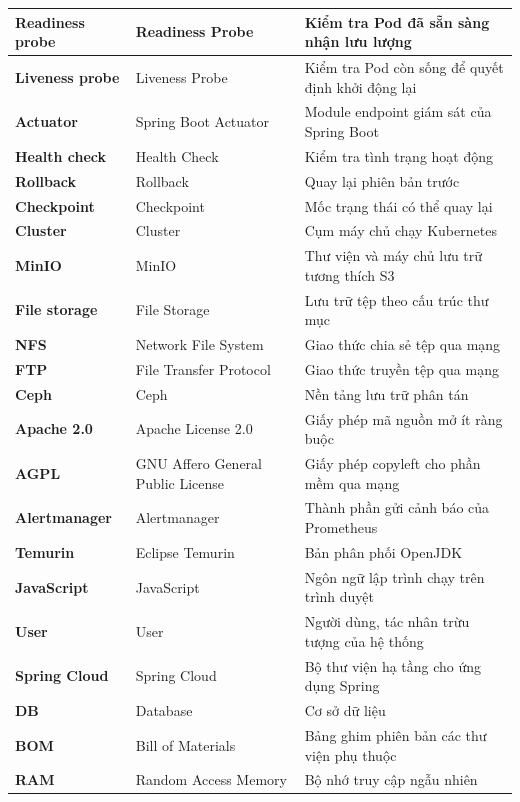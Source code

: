 \documentclass[../BTL.tex]{subfiles}
\begin{document}
\begin{longtable}{|p{3.2cm}|p{3.5cm}|p{7.1cm}|}
	\textbf{Readiness probe} & Readiness Probe & Kiểm tra Pod đã sẵn sàng nhận lưu lượng\\ \hline
	\textbf{Liveness probe} & Liveness Probe & Kiểm tra Pod còn sống để quyết định khởi động lại\\ \hline
	\textbf{Actuator} & Spring Boot Actuator & Module endpoint giám sát của Spring Boot\\ \hline
	\textbf{Health check} & Health Check & Kiểm tra tình trạng hoạt động\\ \hline
	\textbf{Rollback} & Rollback & Quay lại phiên bản trước\\ \hline
	\textbf{Checkpoint} & Checkpoint & Mốc trạng thái có thể quay lại\\ \hline
	\textbf{Cluster} & Cluster & Cụm máy chủ chạy Kubernetes\\ \hline
	\textbf{MinIO} & MinIO & Thư viện và máy chủ lưu trữ tương thích S3\\ \hline
	\textbf{File storage} & File Storage & Lưu trữ tệp theo cấu trúc thư mục\\ \hline
	\textbf{NFS} & Network File System & Giao thức chia sẻ tệp qua mạng\\ \hline
	\textbf{FTP} & File Transfer Protocol & Giao thức truyền tệp qua mạng\\ \hline
	\textbf{Ceph} & Ceph & Nền tảng lưu trữ phân tán\\ \hline
	\textbf{Apache 2.0} & Apache License 2.0 & Giấy phép mã nguồn mở ít ràng buộc\\ \hline
	\textbf{AGPL} & GNU Affero General Public License & Giấy phép copyleft cho phần mềm qua mạng\\ \hline
	\textbf{Alertmanager} & Alertmanager & Thành phần gửi cảnh báo của Prometheus\\ \hline
	\textbf{Temurin} & Eclipse Temurin & Bản phân phối OpenJDK\\ \hline
	\textbf{JavaScript} & JavaScript & Ngôn ngữ lập trình chạy trên trình duyệt\\ \hline
	\textbf{User} & User & Người dùng, tác nhân trừu tượng của hệ thống\\ \hline
	\textbf{Spring Cloud} & Spring Cloud & Bộ thư viện hạ tầng cho ứng dụng Spring\\ \hline
	\textbf{DB} & Database & Cơ sở dữ liệu\\ \hline
	\textbf{BOM} & Bill of Materials & Bảng ghim phiên bản các thư viện phụ thuộc\\ \hline
	\textbf{RAM} & Random Access Memory & Bộ nhớ truy cập ngẫu nhiên\\ \hline

\end{longtable}
\end{document}
